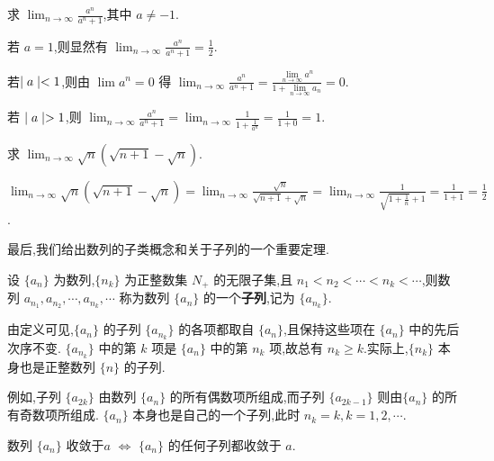 \begin{example}
    求 $\lim_{n\to\infty} \frac{a^n}{a^n+1}$,其中 $a\ne -1$.
\end{example}

\begin{solve}
    若 $a=1$,则显然有 $\lim_{n\to\infty} \frac{a^n}{a^n+1}=\frac{1}{2}$.

    若$\mid a \mid<1$,则由 $\lim a^n=0$ 得 $\lim_{n\to\infty} \frac{a^n}{a^n+1}=\frac{\lim\limits_{n\to\infty} a^n}{1+\lim\limits_{n\to\infty} a_n}=0.$

    若 $\mid a \mid>1$,则 $\lim_{n\to\infty} \frac{a^n}{a^n+1}=\lim_{n\to\infty} \frac{1}{1+\frac{1}{a^n}}=\frac{1}{1+0}=1$.
\end{solve}

\begin{example}
    求 $\lim_{n\to\infty} \sqrt{n}(\sqrt{n+1}-\sqrt{n})$.
\end{example}

\begin{solve}
    $\lim_{n\to\infty} \sqrt{n}(\sqrt{n+1}-\sqrt{n})=\lim_{n\to\infty} \frac{\sqrt{n}}{\sqrt{n+1}+\sqrt{n}}=\lim_{n\to\infty} \frac{1}{\sqrt{1+\frac{1}{n}}+1}=\frac{1}{1+1}=\frac{1}{2}$.
\end{solve}

最后,我们给出数列的子类概念和关于子列的一个重要定理.

\begin{definition}[子列]
    设 $\{a_n\}$ 为数列,$\{n_k\}$ 为正整数集 $N_+$ 的无限子集,且 $n_1<n_2<\cdots<n_k<\cdots$,则数列 $a_{n_1},a_{n_2},\cdots,a_{n_k},\cdots$ 称为数列 $\{a_n\}$ 的一个\textbf{子列},记为 $\{a_{n_k}\}$. 
\end{definition}

\begin{annotation}
    由定义可见,$\{a_n\}$ 的子列 $\{a_{n_k}\}$ 的各项都取自 $\{a_n\}$,且保持这些项在 $\{a_n\}$ 中的先后次序不变. $\{a_{n_k}\}$ 中的第 $k$ 项是 $\{a_n\}$ 中的第 $n_k$ 项,故总有 $n_k\ge k$.实际上,$\{n_k\}$ 本身也是正整数列 $\{n\}$ 的子列.
\end{annotation}

例如,子列 $\{a_{2k}\}$ 由数列 $\{a_n\}$ 的所有偶数项所组成,而子列 $\{a_{2k-1}\}$ 则由$\{a_n\}$ 的所有奇数项所组成. $\{a_n\}$ 本身也是自己的一个子列,此时 $n_k=k,k=1,2,\cdots$.

\begin{theorem}\label{thm:zilie}
    数列 $\{a_n\}$ 收敛于$a$ $\iff$ $\{a_n\}$ 的任何子列都收敛于 $a$.
\end{theorem}

